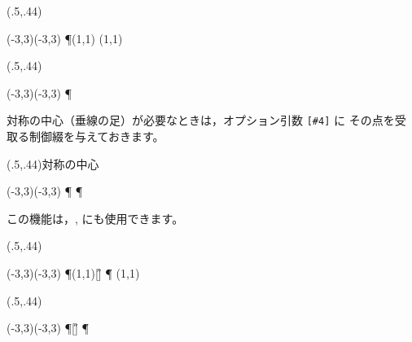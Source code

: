 \begin{showEx}(.5,.44){}
\footnotesize
\begin{zahyou}(-3,3)(-3,3)
\def\houkouV{(1,1)}
\mTaisyouten\P\A\houkouV\Q
\kuromaru{\A;\P;\Q}
\Put{}
\Drawline{\P\Q}
\mTyokusen\A\houkouV{}{}
\end{zahyou}
\end{showEx}

\begin{showEx}(.5,.44){}
\footnotesize
\begin{zahyou}(-3,3)(-3,3)
\def\kaku{60}
\kTaisyouten\P\A\kaku\Q
\kuromaru{\A;\P;\Q}
\Put{}
\Drawline{\P\Q}
\kTyokusen\A\kaku{}{}
\end{zahyou}
\end{showEx}
\bigskip

対称の中心（垂線の足）が必要なときは，オプション引数 \verb/[#4]/ に
その点を受取る制御綴を与えておきます。

\begin{showEx}(.5,.44){対称の中心}
\footnotesize
\begin{zahyou}(-3,3)(-3,3)
\Taisyouten\P\A\B[\H]\Q
\kuromaru{\A;\B;\P;\Q;\H}
\Put{}
\Tyokkakukigou\P\H\A
{}
\Drawline{\P\Q}
\Tyokusen\A\B{}{}
\end{zahyou}
\end{showEx}

この機能は，,  にも使用できます。

\begin{showEx}(.5,.44){}
\footnotesize
\begin{zahyou}(-3,3)(-3,3)
\def\houkouV{(1,1)}
\mTaisyouten\P\A\houkouV[\H]\Q
\kuromaru{\A;\P;\Q;\H}
\Put{}
\Drawline{\P\Q}
\Tyokkakukigou\P\H\A
{}
\mTyokusen\A\houkouV{}{}
\end{zahyou}
\end{showEx}

\begin{showEx}(.5,.44){}
\footnotesize
\begin{zahyou}(-3,3)(-3,3)
\def\kaku{60}
\kTaisyouten\P\A\kaku[\H]\Q
\kuromaru{\A;\P;\Q;\H}
\Put{}
\Drawline{\P\Q}
\Tyokkakukigou\P\H\A
{}
\kTyokusen\A\kaku{}{}
\end{zahyou}
\end{showEx}

